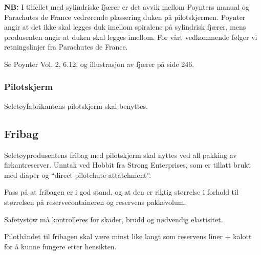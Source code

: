 \textbf{NB:} I tilfellet med sylindriske fjærer er det avvik mellom Poynters manual og Parachutes de France vedrørende plassering duken på pilotskjermen. Poynter angir at det ikke skal legges duk imellom spiralene på sylindrisk fjærer, mens produsenten angir at duken skal legges imellom. For vårt vedkommende følger vi retningslinjer fra Parachutes de France.

Se Poynter Vol. 2, 6.12, og illustrasjon av fjærer på side 246.

\subsubsection{Pilotskjerm}
Seletøyfabrikantens pilotskjerm skal benyttes.

\subsection{Fribag}
Seletøyprodusentens fribag med pilotskjerm skal nyttes ved all pakking av firkantreserver. Unntak ved Hobbit fra Strong Enterprises, som er tillatt brukt med diaper og ``direct pilotchute attatchment''.

Pass på at fribagen er i god stand, og at den er riktig størrelse i forhold til størrelsen på reservecontaineren og reservens pakkevolum.

Safetystow må kontrolleres for skader, brudd og nødvendig elastisitet.

Pilotbåndet til fribagen skal være minst like langt som reservens liner + kalott for å kunne fungere etter hensikten.
